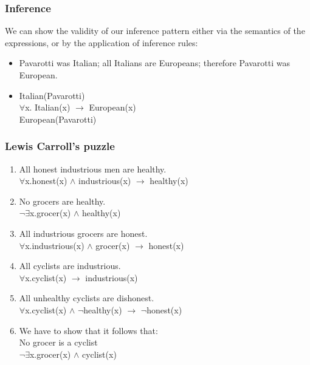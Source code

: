 \documentclass{beamer}
\begin{document}
\begin{frame}

\frametitle{Inference}

We can show the validity of our inference pattern either via the semantics of the expressions, or by the application of inference rules:

\pause

\begin{itemize}

\item Pavarotti was Italian; all Italians are Europeans; therefore Pavarotti was European.

\item Italian(Pavarotti) \\
$\forall$x. Italian(x) $\rightarrow$ European(x) \\
European(Pavarotti)
\end{itemize}

\end{frame}





\begin{frame}

\frametitle{Lewis Carroll's puzzle}

\begin{enumerate}

\item All honest industrious men are healthy. \\
$\forall$x.honest(x) $\wedge$ industrious(x) $\rightarrow$ healthy(x) 

\item No grocers are healthy. \\
$\neg \exists$x.grocer(x) $\wedge$ healthy(x) 

\item All industrious grocers are honest. \\
$\forall$x.industrious(x) $\wedge$ grocer(x) $\rightarrow$ honest(x) 

\item All cyclists are industrious.  \\
$\forall$x.cyclist(x) $\rightarrow$ industrious(x) 

\item All unhealthy cyclists are dishonest.\\
$\forall$x.cyclist(x) $\wedge$ $\neg$healthy(x) $\rightarrow$ $\neg$honest(x)

\item We have to show that it follows that: \\
No grocer is a cyclist \\
$\neg \exists$x.grocer(x) $\wedge$ cyclist(x)

\end{enumerate}

\end{frame}
\end{document}
